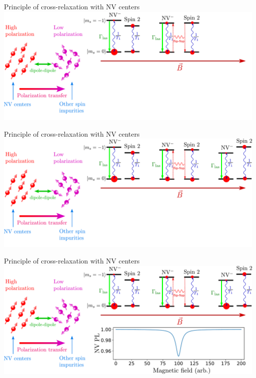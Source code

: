\documentclass{beamer}
\begin{document}
\begin{frame}{Principle of cross-relaxation with NV centers}
\centering
\includegraphics[width=\textwidth,height=0.8\textheight,keepaspectratio]{Slide_CR_presentation_f-2}
\end{frame}

\begin{frame}{Principle of cross-relaxation with NV centers}
\centering
\includegraphics[width=\textwidth,height=0.8\textheight,keepaspectratio]{Slide_CR_presentation_f-1}
\end{frame}

\begin{frame}{Principle of cross-relaxation with NV centers}
\centering
\includegraphics[width=\textwidth,height=0.8\textheight,keepaspectratio]{Slide_CR_presentation_f}
\end{frame}
\end{document}
